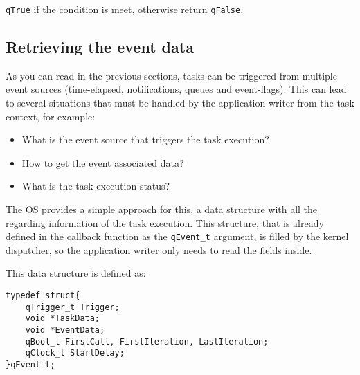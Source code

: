 \lstinline{qTrue} if the condition is meet, otherwise return \lstinline{qFalse}.


\subsection{Retrieving the event data} \label{eventdata} 
As you can read in the previous sections, tasks can be triggered from multiple event sources (time-elapsed, notifications, queues and event-flags). This can lead to several situations that must be handled by the application writer from the task context, for example:

\begin{itemize}
    \item What is the event source that triggers the task execution?
    \item How to get the event associated data?
    \item What is the task execution status? 
\end{itemize}

The OS provides a simple approach for this, a data structure with all the regarding information of the task execution. This structure, that is already defined in the callback function as the \lstinline{qEvent_t} argument, is filled by the kernel dispatcher, so the application writer only needs to read the fields inside.

This data structure is defined as: 
\medskip

\begin{lstlisting}[style=CStyle]
typedef struct{
    qTrigger_t Trigger;
    void *TaskData;
    void *EventData;
    qBool_t FirstCall, FirstIteration, LastIteration;
    qClock_t StartDelay;
}qEvent_t;
\end{lstlisting}

